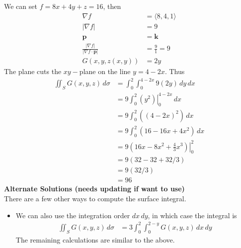     \ifnum {} {\color{DarkBlue} 
    We can set $f = 8x+4y+z=16$, then
    \begin{align*}
        \nabla f & = \langle8,4,1\rangle \\
        |\nabla f | &= 9 \\
        \mathbf p &= \mathbf k \\
        \frac{|\nabla f|}{|\nabla f \cdot \mathbf p|} & = \frac{9}{1} = 9 \\
        G(x,y,z(x,y)) &= 2y  
    \end{align*}
    The plane cuts the $xy-$plane on the line $y = 4 - 2x$. Thus
    \begin{align}
        \iint_S G(x,y,z) \, d\sigma 
        &= \int_0^2 \int_0^{4-2x} 9 (2y) \, dy\, dx \\
        & = 9 \int_0^2 \left. (y^2) \right|_0^{4-2x} \, dx \\
        & = 9 \int_0^2  ((4-2x)^2) \, dx \\
        &= 9 \int_0^2 (16-16x + 4x^2 ) \, dx \\
        &= 9 \left.\left(16x-8x^2 + \frac43x^3 \right) \right|_0^2\\
        &= 9 \left(32-32+32/3 \right) \\
        &= 9 \left(32/3 \right) \\
        &= 96 
    \end{align}
    \textbf{Alternate Solutions (needs updating if want to use)}\\
    There are a few other ways to compute the surface integral. 
    \begin{itemize}
    \item We can also use the integration order $dx\,dy$, in which case the integral is
    \begin{align}
        \iint_S G(x,y,z) \, d\sigma 
        &= 3 \int_0^2 \int_0^{2-y}  G(x,y,z) \, dx\, dy 
    \end{align}    
    The remaining calculations are similar to the above. 
    

\end{itemize}}
